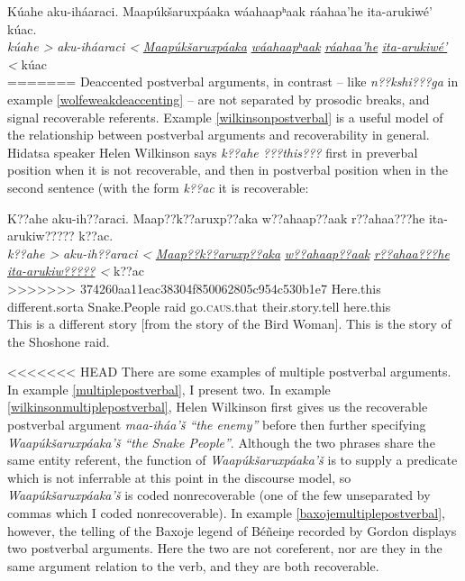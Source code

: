 \documentclass[output=paper]{LSP/langsci}
\begin{document}
\ea\label{wilkinsonpostverbal}
Kúahe aku-iháaraci. Maapúkšaruxpáaka wáahaapʰaak ráahaa’he ita-arukiwé’ kúac.\footnotemark\\
\gll	\emph{kúahe >}	\emph{aku-iháaraci <}	\emph{\underline{Maapúkšaruxpáaka}} 	\emph{\underline{wáahaapʰaak}} 	\emph{\underline{ráahaa’he}}			\emph{\underline{ita-arukiwé’} <}		kúac\\
=======
Deaccented postverbal arguments, in contrast -- like \emph{n??kshi???ga} in example \ref{wolfeweakdeaccenting} -- are not separated by prosodic breaks, and signal recoverable referents. Example \ref{wilkinsonpostverbal} is a useful model of the relationship between postverbal arguments and recoverability in general. Hidatsa speaker Helen Wilkinson says \emph{k??ahe ???this???} first in preverbal position when it is not recoverable, and then in postverbal position when in the second sentence (with the form \emph{k??ac} it is recoverable:

\ea\label{wilkinsonpostverbal}
K??ahe aku-ih??araci. Maap??k??aruxp??aka w??ahaap??aak r??ahaa???he ita-arukiw????? k??ac.\footnotemark\\
\gll	\emph{k??ahe >}	\emph{aku-ih??araci <}	\emph{\underline{Maap??k??aruxp??aka}} 	\emph{\underline{w??ahaap??aak}} 	\emph{\underline{r??ahaa???he}}			\emph{\underline{ita-arukiw?????} <}		k??ac\\
>>>>>>> 374260aa11eac38304f850062805c954c530b1e7
	Here.this 		different.sorta		Snake.People 					raid 						go.\textsc{caus}.that 				their.story.tell 					here.this\\
\glt	This is a different story [from the story of the Bird Woman]. This is the story of the Shoshone raid.
\z

<<<<<<< HEAD
There are some examples of multiple postverbal arguments. In example \ref{multiplepostverbal}, I present two. In example \ref{wilkinsonmultiplepostverbal}, Helen Wilkinson first gives us the recoverable postverbal argument \emph{maa-iháa’š “the enemy”} before then further specifying \emph{Waapúkšaruxpáaka’š “the Snake People”}. Although the two phrases share the same entity referent, the function of \emph{Waapúkšaruxpáaka’š} is to supply a predicate which is not inferrable at this point in the discourse model, so \emph{Waapúkšaruxpáaka’š} is coded nonrecoverable (one of the few unseparated by commas which I coded nonrecoverable). In example \ref{baxojemultiplepostverbal}, however, the telling of the Baxoje legend of Béñeiŋe recorded by Gordon \citet{Marsh1936} displays two postverbal arguments. Here the two are not coreferent, nor are they in the same argument relation to the verb, and they are both recoverable. 
\end{document}
